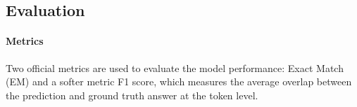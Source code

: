 \documentclass[letterpaper]{article} %
\begin{document}





\subsection{Evaluation}

\paragraph{Metrics} Two official metrics are used to evaluate the model performance: Exact Match (EM) and a softer metric F1 score, which measures the average overlap between the prediction and ground truth answer at the token level.
\end{document}
